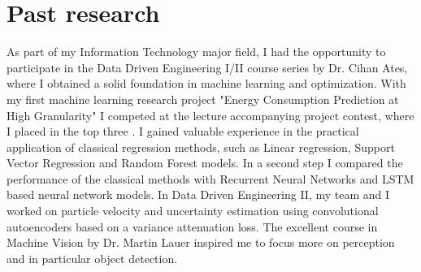 \begin{minipage}[t]{504pt}
\begin{minipage}[t]{350pt}
\setlength{\parindent}{\myindent}
\setlength{\parskip}{\myparskip}

 \vspace*{-8pt}


 \section{Past research}
 As part of my Information Technology major field, I had the opportunity to participate in 
 the Data Driven Engineering I/II course series by Dr. Cihan Ates, where I obtained a solid foundation in machine learning 
 and optimization. With my first machine learning research project "Energy Consumption Prediction at High Granularity" 
 I competed at the lecture accompanying project contest, where I placed in the top three . 
 \color{yellow}I gained valuable experience in the practical 
 application of classical regression methods, such as Linear regression, Support Vector Regression and Random Forest models. 
 In a second step I compared the performance of the
  classical methods with Recurrent Neural Networks and LSTM based neural network models. \color{black} 
  In Data Driven Engineering II, my team and I worked on 
  particle velocity and uncertainty estimation using convolutional autoencoders based on a variance attenuation loss.
The excellent course in Machine Vision by Dr. Martin Lauer inspired me to focus more on perception and in particular object detection.


\end{minipage}
\end{minipage}
